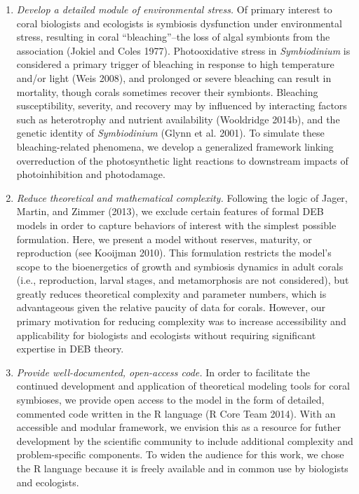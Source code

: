 \documentclass[]{elsarticle} %
\begin{document}
\begin{enumerate}
\def\labelenumi{\arabic{enumi}.}
\item
  \emph{Develop a detailed module of environmental stress.} Of primary
  interest to coral biologists and ecologists is symbiosis dysfunction
  under environmental stress, resulting in coral ``bleaching''--the loss
  of algal symbionts from the association (Jokiel and Coles 1977).
  Photooxidative stress in \emph{Symbiodinium} is considered a primary
  trigger of bleaching in response to high temperature and/or light
  (Weis 2008), and prolonged or severe bleaching can result in
  mortality, though corals sometimes recover their symbionts. Bleaching
  susceptibility, severity, and recovery may by influenced by
  interacting factors such as heterotrophy and nutrient availability
  (Wooldridge 2014b), and the genetic identity of \emph{Symbiodinium}
  (Glynn et al. 2001). To simulate these bleaching-related phenomena, we
  develop a generalized framework linking overreduction of the
  photosynthetic light reactions to downstream impacts of
  photoinhibition and photodamage.
\item
  \emph{Reduce theoretical and mathematical complexity.} Following the
  logic of Jager, Martin, and Zimmer (2013), we exclude certain features
  of formal DEB models in order to capture behaviors of interest with
  the simplest possible formulation. Here, we present a model without
  reserves, maturity, or reproduction (see Kooijman 2010). This
  formulation restricts the model's scope to the bioenergetics of growth
  and symbiosis dynamics in adult corals (i.e., reproduction, larval
  stages, and metamorphosis are not considered), but greatly reduces
  theoretical complexity and parameter numbers, which is advantageous
  given the relative paucity of data for corals. However, our primary
  motivation for reducing complexity was to increase accessibility and
  applicability for biologists and ecologists without requiring
  significant expertise in DEB theory.
\item
  \emph{Provide well-documented, open-access code.} In order to
  facilitate the continued development and application of theoretical
  modeling tools for coral symbioses, we provide open access to the
  model in the form of detailed, commented code written in the R
  language (R Core Team 2014). With an accessible and modular framework,
  we envision this as a resource for futher development by the
  scientific community to include additional complexity and
  problem-specific components. To widen the audience for this work, we
  chose the R language because it is freely available and in common use
  by biologists and ecologists.
\end{enumerate}
\end{document}
